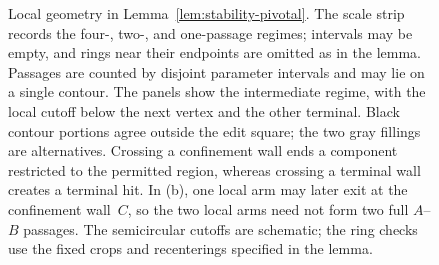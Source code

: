 \begin{figure}[hbp]
\centering

\caption{Local geometry in Lemma~\ref{lem:stability-pivotal}.
The scale strip records the four-, two-, and one-passage regimes;
intervals may be empty, and rings near their endpoints are omitted
as in the lemma. Passages are counted by disjoint parameter intervals
and may lie on a single contour. The panels show the intermediate regime, with
the local cutoff below the next vertex and the other terminal.
Black contour portions agree outside the edit square; the two gray
fillings are alternatives. Crossing a confinement wall ends a
component restricted to the permitted region, whereas crossing a
terminal wall creates a terminal hit. In (b), one local arm may
later exit at the confinement wall~$C$, so the two local arms need
not form two full $A$--$B$ passages. The semicircular cutoffs are
schematic; the ring checks use the fixed crops and recenterings
specified in the lemma.}
\label{fig:pivotal-walls}
\end{figure}

